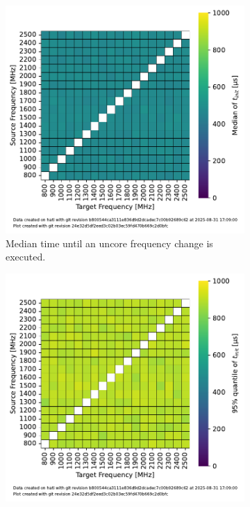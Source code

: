 \begin{figure}[]
    \begin{subfigure}[t]{0.3\linewidth}
        \centering
        \includegraphics[width=\linewidth]{fig/uncore-frequency-switching-latency/median-t-init.pdf}
        \caption{\label{fig:ufs_init_median}Median time until an uncore frequency change is executed.}
    \end{subfigure}
    \hfill
    \begin{subfigure}[t]{0.3\linewidth}
        \centering
        \includegraphics[width=\linewidth]{fig/uncore-frequency-switching-latency/95percentile-t-init.pdf}

\end{subfigure}
\end{figure}
